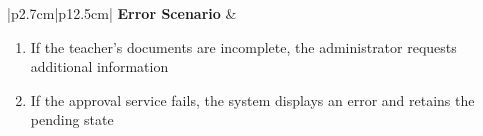 \begin{table}[H]
\begin{tabular}{|p{2.7cm}|p{12.5cm}|}
        \hline
        \textbf{Error Scenario} & \begin{minipage}[t]{\linewidth}
                                      \begin{enumerate}[topsep=0pt,itemsep=1pt,parsep=0pt,partopsep=0pt]
                                          \item If the teacher's documents are incomplete, the administrator requests
                                                additional information
                                          \item If the approval service fails, the system displays an error and retains the
                                                pending state
                                      \end{enumerate}
                                  \end{minipage}                        \\
        \hline
    \end{tabular}
    \label{tab:admin-approve-teacher-accounts}
\end{table}
